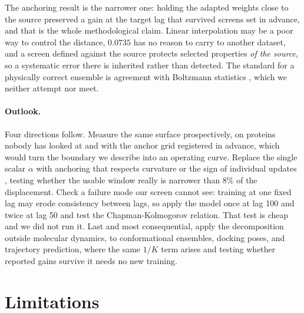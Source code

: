 \documentclass{article}
\begin{document}
The anchoring result is the narrower one: holding the adapted weights close to the source preserved a gain at the target lag that survived screens set in advance, and that is the whole methodological claim. Linear interpolation may be a poor way to control the distance, $0.0735$ has no reason to carry to another dataset, and a screen defined against the source protects selected properties \emph{of the source}, so a systematic error there is inherited rather than detected. The standard for a physically correct ensemble is agreement with Boltzmann statistics \citep{noe2019boltzmann}, which we neither attempt nor meet.

\paragraph{Outlook.} Four directions follow. Measure the same surface prospectively, on proteins nobody has looked at and with the anchor grid registered in advance, which would turn the boundary we describe into an operating curve. Replace the single scalar $\alpha$ with anchoring that respects curvature or the sign of individual updates \citep{kirkpatrick2017overcoming,li2018explicit,yadav2023ties}, testing whether the usable window really is narrower than 8\% of the displacement. Check a failure mode our screen cannot see: training at one fixed lag may erode consistency between lags, so apply the model once at lag 100 and twice at lag 50 and test the Chapman-Kolmogorov relation. That test is cheap and we did not run it. Last and most consequential, apply the decomposition outside molecular dynamics, to conformational ensembles, docking poses, and trajectory prediction, where the same $1/K$ term arises and testing whether reported gains survive it needs no new training.

\section{Limitations}
\label{sec:limits}
\end{document}
